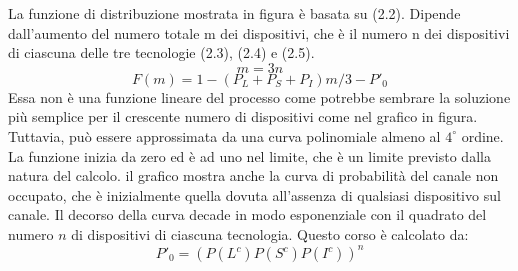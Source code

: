 \documentclass[a4paper]{report} %
\begin{document}
La funzione di distribuzione mostrata in figura è basata su (2.2). Dipende dall'aumento del numero totale m dei dispositivi, che è il numero n dei dispositivi di ciascuna delle tre tecnologie (2.3), (2.4) e (2.5).
\begin{equation}
m = 3n 
\end{equation}
\begin{equation}
F(m) = 1 - (P_L+P_S+P_I)m/3 - P'_0 
\end{equation}
Essa non è una funzione lineare del processo come potrebbe sembrare la soluzione più semplice per il crescente numero di dispositivi come nel grafico in figura. Tuttavia, può essere approssimata da una curva polinomiale almeno al $4^{\circ}$ ordine. La funzione inizia da zero ed è ad uno nel limite, che è un limite previsto dalla natura del calcolo. il grafico mostra anche la curva di probabilità del canale non occupato, che è inizialmente quella dovuta all'assenza di qualsiasi dispositivo sul canale. Il decorso della curva decade in modo esponenziale con il quadrato del numero $n$ di dispositivi di ciascuna tecnologia. Questo corso è calcolato da:
\begin{equation}
P'_0 = (P(L^c)P(S^c)P(I^c))^n 
\end{equation}
\cite{art:rif.46}
\end{document}
